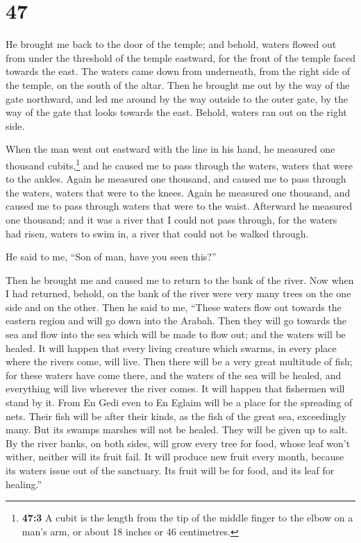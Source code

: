 \hypertarget{section-46}{%
\section{47}\label{section-46}}

 He brought me back to the door of the temple; and behold,
waters flowed out from under the threshold of the temple eastward, for
the front of the temple faced towards the east. The waters came down
from underneath, from the right side of the temple, on the south of the
altar.  Then he brought me out by the way of the gate
northward, and led me around by the way outside to the outer gate, by
the way of the gate that looks towards the east. Behold, waters ran out
on the right side.

 When the man went out eastward with the line in his hand,
he measured one thousand cubits,\footnote{\textbf{47:3} A cubit is the
  length from the tip of the middle finger to the elbow on a man's arm,
  or about 18 inches or 46 centimetres.} and he caused me to pass
through the waters, waters that were to the ankles.  Again
he measured one thousand, and caused me to pass through the waters,
waters that were to the knees. Again he measured one thousand, and
caused me to pass through waters that were to the waist. 
Afterward he measured one thousand; and it was a river that I could not
pass through, for the waters had risen, waters to swim in, a river that
could not be walked through.

 He said to me, ``Son of man, have you seen this?''

Then he brought me and caused me to return to the bank of the river.
 Now when I had returned, behold, on the bank of the river
were very many trees on the one side and on the other. 
Then he said to me, ``These waters flow out towards the eastern region
and will go down into the Arabah. Then they will go towards the sea and
flow into the sea which will be made to flow out; and the waters will be
healed.  It will happen that every living creature which
swarms, in every place where the rivers come, will live. Then there will
be a very great multitude of fish; for these waters have come there, and
the waters of the sea will be healed, and everything will live wherever
the river comes.  It will happen that fishermen will
stand by it. From En Gedi even to En Eglaim will be a place for the
spreading of nets. Their fish will be after their kinds, as the fish of
the great sea, exceedingly many.  But its swamps marshes
will not be healed. They will be given up to salt.  By
the river banks, on both sides, will grow every tree for food, whose
leaf won't wither, neither will its fruit fail. It will produce new
fruit every month, because its waters issue out of the sanctuary. Its
fruit will be for food, and its leaf for healing.''

